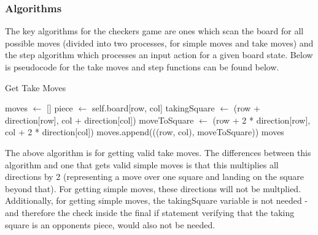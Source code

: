 \documentclass{article}
\begin{document}
    \subsubsection{Algorithms}
    The key algorithms for the checkers game are ones which scan the board for all possible moves (divided into two processes, for simple moves and take moves) and the step algorithm which processes an input action for a given board state.
    Below is pseudocode for the take moves and step functions can be found below.

    \begin{algorithm}
        \caption{Get Take Moves}
        \begin{algorithmic}
                \State moves $\gets$ []
                        \State piece $\gets$ self.board[row, col]
                                    \State takingSquare $\gets$ (row + direction[row], col + direction[col])
                                    \State moveToSquare $\gets$ (row + 2 * direction[row], col + 2 * direction[col])
                                        \State moves.append(((row, col), moveToSquare))
                                    \EndIf
                                \EndIf
                            \EndFor
                        \EndIf
                    \EndFor
                \EndFor
                \State \Return moves
            \EndFunction
        \end{algorithmic}
    \end{algorithm}

    The above algorithm is for getting valid take moves. The differences between this algorithm and one that gets
    valid simple moves is that this multiplies all directions by 2 (representing a move over one square and landing on
    the square beyond that). For getting simple moves, these directions will not be multplied. Additionally, for getting simple moves,
    the takingSquare variable is not needed - and therefore the check inside the final if statement verifying that the taking square is
    an opponents piece, would also not be needed.
\end{document}
